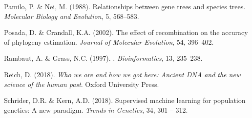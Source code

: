 \documentclass[11pt]{article}
\begin{document}
\begin{thebibliography}{25}
Pamilo, P. \& Nei, M. (1988).
\newblock Relationships between gene trees and species trees.
\newblock \emph{Molecular Biology and Evolution}, 5, 568--583.

Posada, D. \& Crandall, K.A. (2002).
\newblock The effect of recombination on the accuracy of phylogeny estimation.
\newblock \emph{Journal of Molecular Evolution}, 54, 396--402.

Rambaut, A. \& Grass, N.C. (1997).
.
\newblock \emph{Bioinformatics}, 13, 235--238.

Reich, D. (2018).
\newblock \emph{Who we are and how we got here: Ancient DNA and the new science
  of the human past}.
\newblock Oxford University Press.

Schrider, D.R. \& Kern, A.D. (2018).
\newblock Supervised machine learning for population genetics: A new paradigm.
\newblock \emph{Trends in Genetics}, 34, 301 -- 312.

\end{thebibliography}
\end{document}
